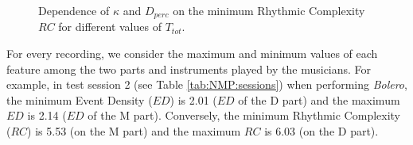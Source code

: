\begin{figure}[!tb]
\begin{flushright}
    \hfil
\end{flushright}
\caption{Dependence of $\kappa$ and $D_{perc}$ on the minimum Rhythmic Complexity $RC$ for different values of $T_{tot}$.}
\label{fig:NMP:minRC}
\end{figure}


 

For every recording, we consider the maximum and minimum values of each feature among the two parts and instruments played by the musicians. For example, in test session 2 (see Table \ref{tab:NMP:sessions}) when performing \textit{Bolero}, the minimum Event Density ($ED$) is 2.01 ($ED$ of the D part) and the maximum $ED$ is 2.14 ($ED$ of the M part). Conversely, the minimum Rhythmic Complexity ($RC$) is 5.53 (on the M part) and the maximum $RC$ is 6.03 (on the D part).

